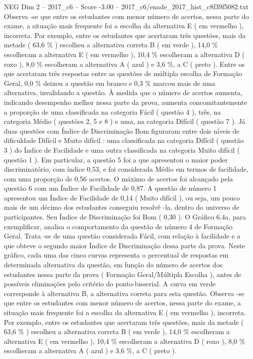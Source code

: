 \begin{textsample}{NEG Dim 2 – 2017\_c6 – Score -3.00 – 2017\_c6/enade\_2017\_hist\_c8f39f5082.txt}
Observa -se que entre os estudantes com menor número de acertos, nessa parte do exame, a situação mais frequente foi a escolha da alternativa E ( em vermelho ), incorreta.
Por exemplo, entre os estudantes que acertaram três questões, mais da metade ( 63,6 \% ) escolheu a alternativa correta B ( em verde ), 14,0 \% escolheram a alternativa E ( em vermelho ), 10,4 \% escolheram a alternativa D ( roxo ), 8,0 \% escolheram a alternativa A ( azul ) e 3,6 \%, a C ( preto ).
Entre os que acertaram três respostas entre as questões de múltipla escolha de Formação Geral, 0,0 \% deixou a questão em branco e 0,3 \% marcou mais de uma alternativa, invalidando a questão.
À medida que o número de acertos aumenta, indicando desempenho melhor nessa parte da prova, aumenta concomitantemente a proporção de uma classificada na categoria Fácil ( questão 4 ), três, na categoria Médio ( questões 2, 5 e 8 ) e uma, na categoria Difícil ( questão 7 ).
Já duas questões com Índice de Discriminação Bom figuraram entre dois níveis de dificuldade Difícil e Muito difícil : uma classificada na categoria Difícil ( questão 3 ) do Índice de Facilidade e uma outra classificada na categoria Muito difícil ( questão 1 ).
Em particular, a questão 5 foi a que apresentou o maior poder discriminatório, com índice 0,53, e foi considerada Médio em termos de facilidade, com uma proporção de 0,56 acertos.
O máximo de acertos foi alcançado pela questão 6 com um Índice de Facilidade de 0,87.
A questão de número 1 apresentou um Índice de Facilidade de 0,14 ( Muito difícil ), ou seja, um pouco mais de um décimo dos estudantes conseguiu resolvê -la, dentro do universo de participantes.
Seu Índice de Discriminação foi Bom ( 0,30 ).
O Gráfico 6.4a, para exemplificar, analisa o comportamento da questão de número 4 de Formação Geral.
Trata -se de uma questão considerada Fácil, com relação à facilidade e a que obteve o segundo maior Índice de Discriminação dessa parte da prova.
Neste gráfico, cada uma das cinco curvas representa o percentual de respostas em determinada alternativa da questão, em função do número de acertos dos estudantes nessa parte da prova ( Formação Geral/Múltipla Escolha ), antes de possíveis eliminações pelo critério do ponto-bisserial.
A curva em verde corresponde à alternativa B, a alternativa correta para esta questão.
Observa -se que entre os estudantes com menor número de acertos, nessa parte do exame, a situação mais frequente foi a escolha da alternativa E ( em vermelho ), incorreta.
Por exemplo, entre os estudantes que acertaram três questões, mais da metade ( 63,6 \% ) escolheu a alternativa correta B ( em verde ), 14,0 \% escolheram a alternativa E ( em vermelho ), 10,4 \% escolheram a alternativa D ( roxo ), 8,0 \% escolheram a alternativa A ( azul ) e 3,6 \%, a C ( preto ).

\end{textsample}
